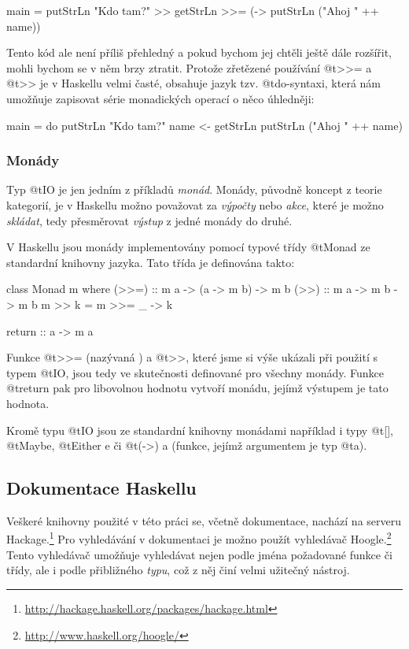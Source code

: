 \begin{haskell}
main = 
  putStrLn "Kdo tam?" >>
    getStrLn >>= (\name ->
      putStrLn ("Ahoj " ++ name))
\end{haskell}

Tento kód ale není příliš přehledný a pokud bychom jej chtěli ještě dále
rozšířit, mohli bychom se v něm brzy ztratit. Protože zřetězené používání
@t{>>=} a @t{>>} je v Haskellu velmi časté, obsahuje jazyk tzv. @t{do}-syntaxi,
která nám umožňuje zapisovat série monadických operací o něco úhledněji:

\begin{haskell}
main = do
  putStrLn "Kdo tam?"
  name <- getStrLn
  putStrLn ("Ahoj " ++ name)
\end{haskell}

\subsubsection{Monády}

Typ @t{IO} je jen jedním z příkladů \emph{monád}. Monády, původně koncept z
teorie kategorií, je v Haskellu možno považovat za \emph{výpočty} nebo
\emph{akce}, které je možno \emph{skládat}, tedy přesměrovat \emph{výstup} z
jedné monády do druhé.

V Haskellu jsou monády implementovány pomocí typové třídy @t{Monad} ze
standardní knihovny jazyka. Tato třída je definována takto:

\begin{haskell}
class Monad m where
  (>>=)  :: m a -> (a -> m b) -> m b
  (>>)   :: m a -> m b -> m b
  m >> k  = m >>= \_ -> k

  return :: a -> m a
\end{haskell}

Funkce @t{>>=} (nazývaná ) a @t{>>}, které jsme si výše ukázali při
použití s typem @t{IO}, jsou tedy ve skutečnosti definované pro všechny monády.
Funkce @t{return} pak pro libovolnou hodnotu vytvoří monádu, jejímž výstupem je
tato hodnota.

Kromě typu @t{IO} jsou ze standardní knihovny monádami například i typy @t{[]},
@t{Maybe}, @t{Either e} či @t{(->) a} (funkce, jejímž argumentem je typ @t{a}).

\subsection{Dokumentace Haskellu}

Veškeré knihovny použité v této práci se, včetně dokumentace, nachází na serveru
Hackage.\footnote{\url{http://hackage.haskell.org/packages/hackage.html}} Pro
vyhledávání v dokumentaci je možno použít vyhledávač
Hoogle.\footnote{\url{http://www.haskell.org/hoogle/}} Tento vyhledávač umožňuje
vyhledávat nejen podle jména požadované funkce či třídy, ale i podle přibližného
\emph{typu}, což z něj činí velmi užitečný nástroj.


